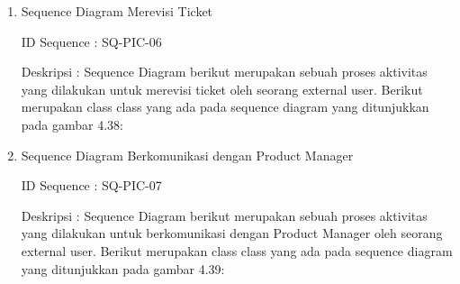 \documentclass[12pt]{article}
\begin{document}
\begin{enumerate}[label=\textbf{4.\arabic*.}]
\begin{enumerate} [label=\textbf{4.2.\arabic*.}, wide, labelwidth=!, labelindent=0pt]
\begin{enumerate}[label=\textbf{4.2.2.\arabic*.}, wide, labelwidth=!, labelindent=0pt]
\begin{enumerate}[label=\arabic*.]
                \item Sequence Diagram Merevisi Ticket
                
                \noindent ID Sequence	: SQ-PIC-06
                
                \noindent Deskripsi	: Sequence Diagram berikut merupakan sebuah proses aktivitas yang dilakukan untuk merevisi ticket oleh seorang external user. Berikut merupakan class class yang ada pada sequence diagram yang ditunjukkan pada gambar 4.38:
                
                
                \item Sequence Diagram Berkomunikasi dengan Product Manager
                
                \noindent ID Sequence	: SQ-PIC-07
                
                \noindent Deskripsi	: Sequence Diagram berikut merupakan sebuah proses aktivitas yang dilakukan untuk berkomunikasi dengan Product Manager oleh seorang external user. Berikut merupakan class class yang ada pada sequence diagram yang ditunjukkan pada gambar 4.39:
                




                
                

\end{enumerate}
\end{enumerate}
\end{enumerate}
\end{enumerate}
\end{document}
